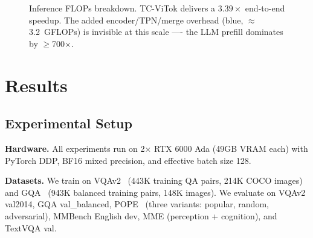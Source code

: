 \documentclass{article}
\begin{document}
\begin{figure}[t]
\centering
{}
\caption{Inference FLOPs breakdown. TC-ViTok delivers a $3.39\times$ end-to-end
speedup. The added encoder/TPN/merge overhead (blue, $\approx$3.2~GFLOPs)
is invisible at this scale —- the LLM prefill dominates by $\geq$700{$\times$}.}
\label{fig:flops}
\end{figure}

\section{Results}
\label{sec:results}

\subsection{Experimental Setup}
\label{sec:experiments-list}

\textbf{Hardware.}
All experiments run on 2$\times$ RTX 6000 Ada (49GB VRAM each) with PyTorch DDP,
BF16 mixed precision, and effective batch size 128.

\textbf{Datasets.}
We train on VQAv2~\cite{goyal2017vqav2} (443K training QA pairs, 214K COCO images)
and GQA~\cite{hudson2019gqa} (943K balanced training pairs, 148K images).
We evaluate on VQAv2 val2014, GQA val\_balanced, POPE~\cite{li2023pope}
(three variants: popular, random, adversarial), MMBench English dev,
MME (perception + cognition), and TextVQA val.
\end{document}
